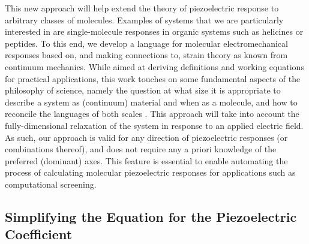 This new approach will help extend the theory of piezoelectric response to arbitrary classes of molecules. 
Examples of
systems that we are particularly interested in are single-molecule responses in organic systems such as helicines or
peptides. 
To this end, we develop a language for molecular electromechanical responses based on, and making connections to, strain
theory as known from continuum mechanics. 
While aimed at deriving definitions and working equations for practical
applications, this work touches on some fundamental aspects of the philosophy of science, namely the question at what
size it is appropriate to describe a system as (continuum) material and when as a molecule, and how to reconcile the
languages of both scales \cite{hartmann}. 
This approach will take into account the fully-dimensional relaxation of the
system in response to an applied electric field. 
As such, our approach is valid for any direction of piezoelectric
responses (or combinations thereof), and does not require any a priori knowledge of the preferred (dominant) axes. 
This
feature is essential to enable automating the process of calculating molecular piezoelectric responses for applications such
as computational screening. 

\subsection{Simplifying the Equation for the Piezoelectric Coefficient}

